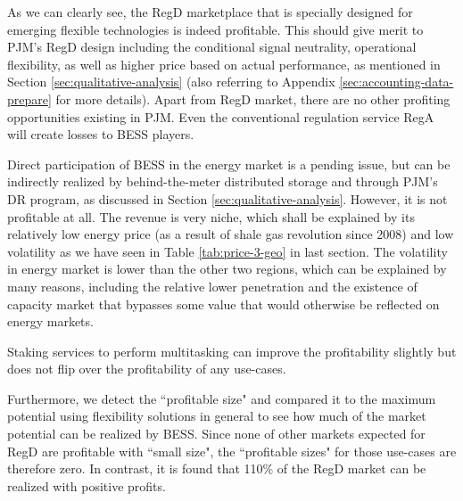 As we can clearly see, the RegD marketplace that is specially designed for emerging flexible technologies is indeed profitable. This should give merit to PJM's RegD design including the conditional signal neutrality, operational flexibility, as well as higher price based on actual performance, as mentioned in Section \ref{sec:qualitative-analysis} (also referring to Appendix \ref{sec:accounting-data-prepare} for more details). Apart from RegD market, there are no other profiting opportunities existing in PJM. Even the conventional regulation service RegA will create losses to BESS players.

Direct participation of BESS in the energy market is a pending issue, but can be indirectly realized by behind-the-meter distributed storage and through PJM's DR program, as discussed in Section \ref{sec:qualitative-analysis}. However, it is not profitable at all. The revenue is very niche, which shall be explained by its relatively low energy price (as a result of shale gas revolution since 2008) and low volatility as we have seen in Table \ref{tab:price-3-geo} in last section. The volatility in energy market is lower than the other two regions, which can be explained by many reasons, including the relative lower penetration and the existence of capacity market that bypasses some value that would otherwise be reflected on energy markets.

Staking services to perform multitasking can improve the profitability slightly but does not flip over the profitability of any use-cases. 

Furthermore, we detect the ``profitable size" and compared it to the maximum potential using flexibility solutions in general to see how much of the market potential can be realized by BESS. Since none of other markets expected for RegD are profitable with ``small size", the ``profitable sizes" for those use-cases are therefore zero. In contrast, it is found that 110\% of the RegD market can be realized with positive profits.



